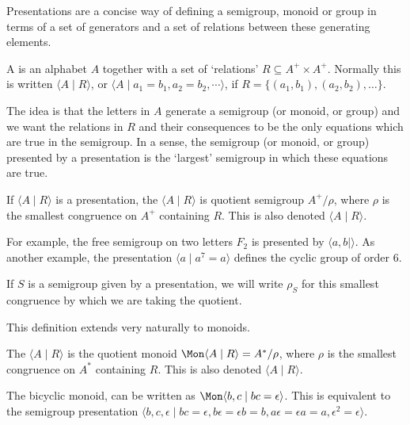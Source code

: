 \documentclass[noindex,noinsetproof,12pt]{lmaths}
\begin{document}
Presentations are a concise way of defining a semigroup, monoid or group in terms of a set of generators and a set of relations between these generating elements.

\begin{defn}
	A  is an alphabet $A$ together with a set of `relations' $R \subseteq A^+ \times A^+$. Normally this is written $\langle A \mid R\rangle$, or $\langle A \mid a_1 = b_1, a_2 = b_2, \cdots \rangle$, if $R = \{(a_1, b_1), (a_2, b_2), \ldots\}$.
\end{defn}

The idea is that the letters in $A$ generate a semigroup (or monoid, or group) and we want the relations in $R$ and their consequences to be the only equations which are true in the semigroup. In a sense, the semigroup (or monoid, or group) presented by a presentation is the `largest' semigroup in which these equations are true.

\begin{defn}
	If $\langle A \mid R \rangle$ is a presentation, the  $\langle A \mid R\rangle$ is quotient semigroup $A^+/\rho$, where $\rho$ is the smallest congruence on $A^+$ containing $R$. This is also denoted $\langle A \mid R \rangle$.
\end{defn}

For example, the free semigroup on two letters $F_2$ is presented by $\langle a, b \mid \rangle$. As another example, the presentation $\langle a \mid a^7 = a \rangle$ defines the cyclic group of order 6.

If $S$ is a semigroup given by a presentation, we will write $\rho_S$ for this smallest congruence by which we are taking the quotient.

This definition extends very naturally to monoids.

\begin{defn}
	The  $\langle A \mid R\rangle$ is the quotient monoid $\Mon \langle A \mid R\rangle = A^*/\rho$, where $\rho$ is the smallest congruence on $A^*$ containing $R$. This is also denoted $\langle A \mid R \rangle$.
\end{defn}

\begin{example}
The bicyclic monoid, can be written as $\Mon \langle b, c \mid bc = \epsilon \rangle$. This is equivalent to the semigroup presentation $\langle b, c, \epsilon \mid bc = \epsilon, b\epsilon = \epsilon b = b, a\epsilon = \epsilon a = a, \epsilon^2 = \epsilon \rangle$.
\end{example}
\end{document}
